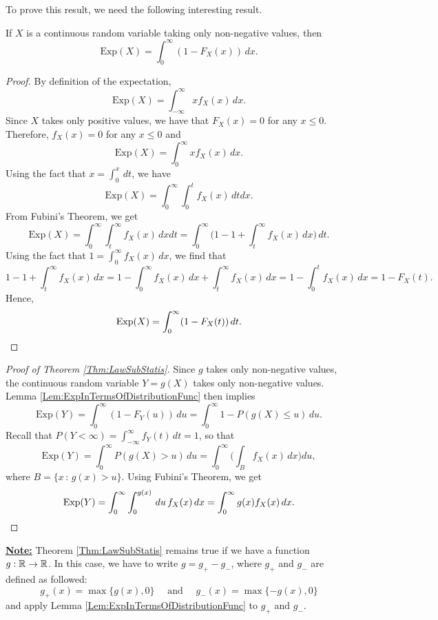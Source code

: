 To prove this result, we need the following interesting result.

\begin{lemma}\label{Lem:ExpInTermsOfDistributionFunc}
If $X$ is a continuous random variable taking only non-negative values, then
    \[
        \mathrm{Exp} (X) = \int_0^\infty (1 - F_X (x)) \, dx .
    \]
\end{lemma}
\begin{proof}
By definition of the expectation, 
    \[
        \mathrm{Exp} (X) = \int_{-\infty}^\infty x f_X (x) \, dx .
    \]
Since $X$ takes only positive values, we have that $F_X (x) = 0$ for any $x \leq 0$. Therefore, $f_X (x) = 0$ for any $x \leq 0$ and
    \[
        \mathrm{Exp} (X) = \int_0^\infty x f_X (x) \, dx .
    \]
Using the fact that $x = \displaystyle\int_0^x  \, dt$, we have
    \[
        \mathrm{Exp} (X) = \int_0^\infty \int_0^t f_X (x) \, dt dx .
    \]
From Fubini's Theorem, we get
    \[
        \mathrm{Exp} (X) = \int_0^\infty \int_t^\infty f_X (x) \, dx dt = \int_0^\infty \Big( 1 - 1 + \int_t^\infty f_X (x) \, dx \Big) \,  dt .
    \]
Using the fact that $1 = \int_{0}^{\infty} f_X (x) \, dx$, we find that
    \[
        1 - 1 + \int_t^\infty f_X (x) \, dx = 1 - \int_0^\infty f_X (x) \, dx + \int_t^\infty f_X (x) \, dx = 1 - \int_0^t f_X (x) \, dx = 1 - F_X (t) .
    \]
Hence,
    \[
        \mathrm{Exp} (X) = \int_0^\infty (1 - F_X (t)) \, dt . \qedhere
    \]

\end{proof}

\begin{proof}[Proof of Theorem \ref{Thm:LawSubStatis}]
Since $g$ takes only non-negative values, the continuous random variable $Y = g(X)$ takes only non-negative values. Lemma \ref{Lem:ExpInTermsOfDistributionFunc} then implies
    \[
        \mathrm{Exp} (Y) = \int_0^\infty (1 - F_Y (u) ) \, du = \int_0^\infty 1 - P (g(X) \leq u ) \, du .
    \]
Recall that $P (Y < \infty ) = \int_{-\infty}^\infty f_Y (t) \, dt = 1$, so that
    \[
        \mathrm{Exp} (Y) = \int_0^\infty P (g(X) > u ) \, du = \int_0^\infty \Big( \int_B f_X (x) \, dx \Big) du ,
    \]
where $B = \{ x \, : \, g(x) > u \}$. Using Fubini's Theorem, we get
    \[
        \mathrm{Exp} (Y) = \int_0^\infty \int_0^{g(x)} \, du \, f_X (x) \, dx = \int_0^\infty g(x) f_X (x) \, dx . \qedhere
    \]
\end{proof}

\underline{\textbf{Note:}} Theorem \ref{Thm:LawSubStatis} remains true if we have a function $g : \mathbb{R} \rightarrow \mathbb{R}$. In this case, we have to write $g = g_+ - g_-$, where $g_+$ and $g_-$ are defined as followed:
    \[
        g_+ (x) = \max \{ g (x) , 0 \} \quad \text{ and } \quad g_- (x) = \max \{ -g(x) , 0 \} 
    \]
and apply Lemma \ref{Lem:ExpInTermsOfDistributionFunc} to $g_+$ and $g_-$.

